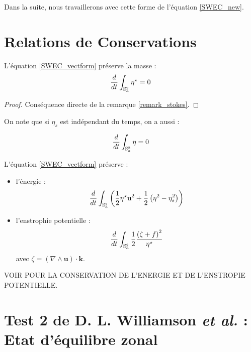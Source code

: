 Dans la suite, nous travaillerons avec cette forme de l'équation \eqref{SWEC_new}.


\section{Relations de Conservations}

\begin{proposition}
L'équation \eqref{SWEC_vectform} préserve la masse :
\begin{equation}
\dfrac{d}{dt}\displaystyle\int_{\mathbb{S}_a^2} \eta^{\star} = 0
\end{equation}
\end{proposition}

\begin{proof}
Conséquence directe de la remarque \ref{remark_stokes}.
\end{proof}

\begin{remarque}
On note que si $\eta_s$ est indépendant du temps, on a aussi :

\begin{equation}
\dfrac{d}{dt}\displaystyle\int_{\mathbb{S}_a^2} \eta = 0
\end{equation}
\end{remarque}

\begin{proposition}
L'équation \eqref{SWEC_vectform} préserve :
\begin{itemize}
\item l'énergie :
\begin{equation}
\dfrac{d}{dt} \displaystyle\int_{\mathbb{S}_a^2} \left( \dfrac{1}{2} \eta^{\star} \mathbf{u}^2 + \dfrac{1}{2} \left( \eta^2 - \eta_s^2 \right) \right)
\end{equation}
\item l'enstrophie potentielle :
\begin{equation}
\dfrac{d}{dt} \displaystyle\int_{\mathbb{S}_a^2} \dfrac{1}{2}\dfrac{\left(\zeta + f\right)^2}{\eta^{\star}}
\end{equation}
avec $\zeta=\left( \nabla \wedge \mathbf{u} \right)\cdot\mathbf{k}$.

\end{itemize}
\end{proposition}

VOIR POUR LA CONSERVATION DE L'ENERGIE ET DE L'ENSTROPIE POTENTIELLE.


\section{Test 2 de D. L. Williamson \textit{et al.} : Etat d'équilibre zonal}


